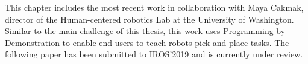 This chapter includes the most recent work in collaboration with Maya Cakmak, director of the Human-centered robotics Lab at the University of Washington.
Similar to the main challenge of this thesis, this work uses Programming by Demonstration to enable end-users to teach robots pick and place tasks.
The following paper has been submitted to IROS'2019 and is currently under review.
%
